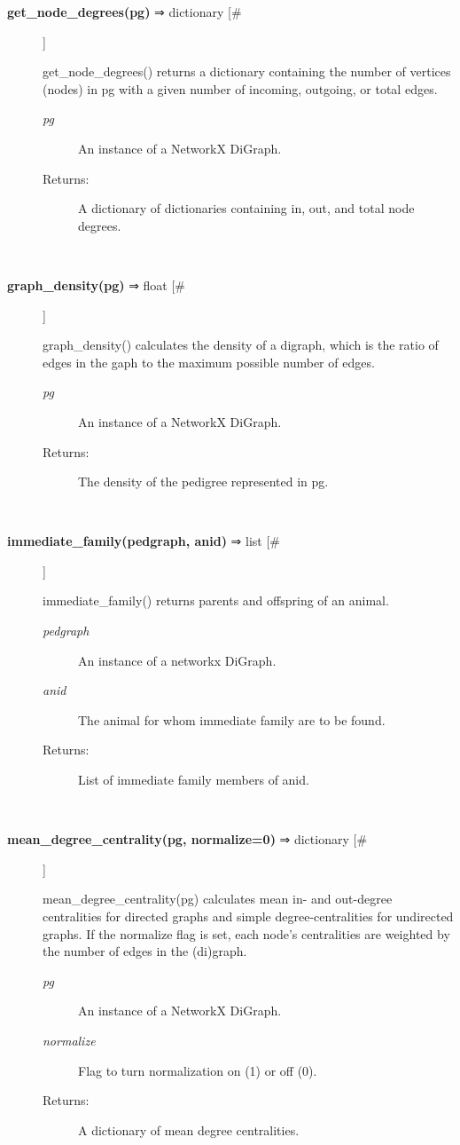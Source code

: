 \documentclass{article}
\begin{document}
\begin{description}
\item[\textbf{get\_node\_degrees(pg)} ⇒ dictionary [\#]
]
\par get\_node\_degrees() returns a dictionary containing the number of
vertices (nodes) in pg with a given number of incoming, outgoing,
or total edges.
\begin{description}
\item[\textit{pg}
]
An instance of a NetworkX DiGraph.
\item[Returns:
]
A dictionary of dictionaries containing in, out, and total node degrees.
\end{description}\\

\item[\textbf{graph\_density(pg)} ⇒ float [\#]
]
\par graph\_density() calculates the density of a digraph, which is the
ratio of edges in the gaph to the maximum possible number of edges.
\begin{description}
\item[\textit{pg}
]
An instance of a NetworkX DiGraph.
\item[Returns:
]
The density of the pedigree represented in pg.
\end{description}\\

\item[\textbf{immediate\_family(pedgraph, anid)} ⇒ list [\#]
]
\par immediate\_family() returns parents and offspring of an animal.
\begin{description}
\item[\textit{pedgraph}
]
An instance of a networkx DiGraph.
\item[\textit{anid}
]
The animal for whom immediate family are to be found.
\item[Returns:
]
List of immediate family members of anid.
\end{description}\\

\item[\textbf{mean\_degree\_centrality(pg, normalize=0)} ⇒ dictionary [\#]
]
\par mean\_degree\_centrality(pg) calculates mean in- and out-degree
centralities for directed graphs and simple degree-centralities
for undirected graphs. If the normalize flag is set, each node's
centralities are weighted by the number of edges in the (di)graph.
\begin{description}
\item[\textit{pg}
]
An instance of a NetworkX DiGraph.
\item[\textit{normalize}
]
Flag to turn normalization on (1) or off (0).
\item[Returns:
]
A dictionary of mean degree centralities.
\end{description}\\


\end{description}
\end{document}
